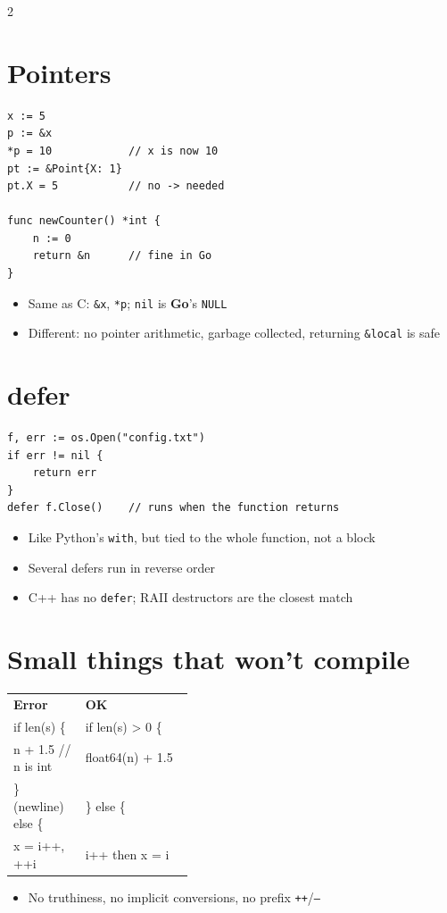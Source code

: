 \documentclass[9pt]{extarticle}
\newcommand{\Go}{\textbf{\textcolor{goblue}{Go}}}
\newcommand{\kw}[1]{\textcolor{accent}{\texttt{#1}}}
\begin{document}
\begin{multicols*}{2}
\section{Pointers}
\begin{lstlisting}
x := 5
p := &x
*p = 10            // x is now 10
pt := &Point{X: 1}
pt.X = 5           // no -> needed

func newCounter() *int {
    n := 0
    return &n      // fine in Go
}
\end{lstlisting}
\begin{itemize}
  \item Same as C: \kw{\&x}, \kw{*p}; \kw{nil} is \Go's \kw{NULL}
  \item Different: no pointer arithmetic, garbage collected, returning \kw{\&local} is safe
\end{itemize}

\section{defer}
\begin{lstlisting}
f, err := os.Open("config.txt")
if err != nil {
    return err
}
defer f.Close()    // runs when the function returns
\end{lstlisting}
\begin{itemize}
  \item Like Python's \kw{with}, but tied to the whole function, not a block
  \item Several defers run in reverse order
  \item C++ has no \kw{defer}; RAII destructors are the closest match
\end{itemize}

\section{Small things that won't compile}
{\footnotesize
\begin{tabularx}{\linewidth}{@{}>{\ttfamily}p{0.40\linewidth}>{\ttfamily}X@{}}
\rowcolor{tablehead}\textsf{\textbf{Error}} & \textsf{\textbf{OK}}\\
if len(s) \{           & if len(s) > 0 \{\\
n + 1.5  \textcolor{comment}{// n is int} & float64(n) + 1.5\\
\} \textcolor{comment}{(newline)} else \{ & \} else \{\\
x = i++, ++i           & i++ \textsf{then} x = i\\
\end{tabularx}}
\begin{itemize}
  \item No truthiness, no implicit conversions, no prefix \kw{++}/\kw{--}
\end{itemize}


\end{multicols*}
\end{document}
